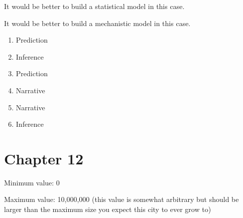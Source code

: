 \documentclass[]{memoir}
\begin{document}

It would be better to build a statistical model in this case.


It would be better to build a mechanistic model in this case.


\begin{enumerate}
\def\labelenumi{\arabic{enumi}.}
\itemsep1pt\parskip0pt
\item
  Prediction
\item
  Inference
\item
  Prediction
\item
  Narrative
\item
  Narrative
\item
  Inference
\end{enumerate}

\section{Chapter 12}


Minimum value: 0

Maximum value: 10,000,000 (this value is somewhat arbitrary but should
be larger than the maximum size you expect this city to ever grow to)

\end{document}
